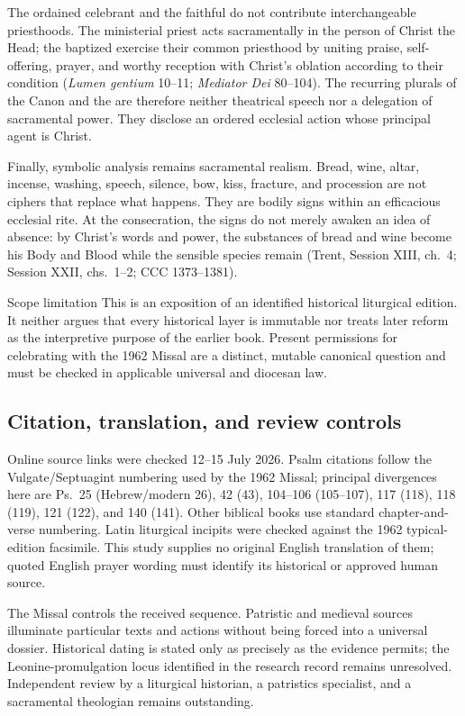 {The ordained celebrant and the faithful do not contribute interchangeable priesthoods. The ministerial priest acts sacramentally in the person of Christ the Head; the baptized exercise their common priesthood by uniting praise, self-offering, prayer, and worthy reception with Christ's oblation according to their condition (\emph{Lumen gentium} 10--11; \emph{Mediator Dei} 80--104). The recurring plurals of the Canon and the  are therefore neither theatrical speech nor a delegation of sacramental power. They disclose an ordered ecclesial action whose principal agent is Christ.

Finally, symbolic analysis remains sacramental realism. Bread, wine, altar, incense, washing, speech, silence, bow, kiss, fracture, and procession are not ciphers that replace what happens. They are bodily signs within an efficacious ecclesial rite. At the consecration, the signs do not merely awaken an idea of absence: by Christ's words and power, the substances of bread and wine become his Body and Blood while the sensible species remain (Trent, Session XIII, ch.~4; Session XXII, chs.~1--2; CCC 1373--1381).

\begin{massbox}{Scope limitation}
This is an exposition of an identified historical liturgical edition. It neither argues that every historical layer is immutable nor treats later reform as the interpretive purpose of the earlier book. Present permissions for celebrating with the 1962 Missal are a distinct, mutable canonical question and must be checked in applicable universal and diocesan law.
\end{massbox}

\subsection{Citation, translation, and review controls}

Online source links were checked 12--15 July 2026. Psalm citations follow the Vulgate/Septuagint numbering used by the 1962 Missal; principal divergences here are Ps.~25 (Hebrew/modern 26), 42 (43), 104--106 (105--107), 117 (118), 118 (119), 121 (122), and 140 (141). Other biblical books use standard chapter-and-verse numbering. Latin liturgical incipits were checked against the 1962 typical-edition facsimile. This study supplies no original English translation of them; quoted English prayer wording must identify its historical or approved human source.

The Missal controls the received sequence. Patristic and medieval sources illuminate particular texts and actions without being forced into a universal dossier. Historical dating is stated only as precisely as the evidence permits; the Leonine-promulgation locus identified in the research record remains unresolved. Independent review by a liturgical historian, a patristics specialist, and a sacramental theologian remains outstanding.
}
